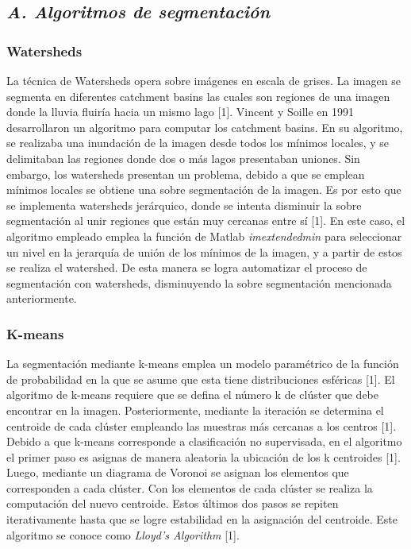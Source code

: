 \documentclass[10pt,twocolumn,letterpaper]{article}
\begin{document}
\subsection{\textit{A. Algoritmos de segmentación}}

\subsubsection*{ Watersheds}
La técnica de Watersheds opera sobre imágenes en escala de grises. La imagen se segmenta en diferentes catchment basins las cuales son regiones de una imagen donde la lluvia fluiría hacia un mismo lago [1]. Vincent y Soille en 1991 desarrollaron un algoritmo para computar los catchment basins. En su algoritmo, se realizaba una inundación de la imagen desde todos los mínimos locales, y se delimitaban las regiones donde dos o más lagos presentaban uniones. Sin embargo, los watersheds presentan un problema, debido a que se emplean mínimos locales se obtiene una sobre segmentación de la imagen. Es por esto que se implementa watersheds jerárquico, donde se intenta disminuir la sobre segmentación al unir regiones que están muy cercanas entre sí [1].
En este caso, el algoritmo empleado emplea la función de Matlab \textit{imextendedmin} para seleccionar un nivel en la jerarquía de unión de los mínimos de la imagen, y a partir de estos se realiza el watershed. De esta manera se logra automatizar el proceso de segmentación con watersheds, disminuyendo la sobre segmentación mencionada anteriormente.

\subsubsection*{ K-means}

La segmentación mediante k-means emplea un modelo paramétrico de la función de probabilidad en la que se asume que esta tiene distribuciones esféricas [1]. El algoritmo de k-means requiere que se defina el número k de clúster que debe encontrar en la imagen. Posteriormente, mediante la iteración se determina el centroide de cada clúster empleando las muestras más cercanas a los centros [1].
Debido a que k-means corresponde a clasificación no supervisada, en el algoritmo el primer paso es asignas de manera aleatoria la ubicación de los k centroides [1]. Luego, mediante un diagrama de Voronoi se asignan los elementos que corresponden a cada clúster. Con los elementos de cada clúster se realiza la computación del nuevo centroide. Estos últimos dos pasos se repiten iterativamente hasta que se logre estabilidad en la asignación del centroide. Este algoritmo se conoce como \textit{Lloyd’s Algorithm} [1].
\end{document}
